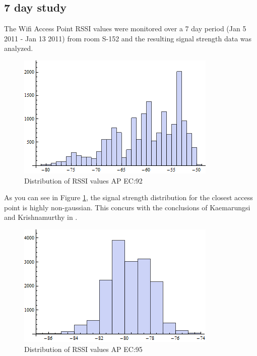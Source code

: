 \subsection{7 day study}

The Wifi Access Point RSSI values were monitored over a 7 day period 
(Jan 5 2011 - Jan 13 2011) from room S-152 and the resulting signal strength 
data was analyzed.


\begin{figure}\centering
    \includegraphics{figures/histogram_00_1C_F0_CB_EC_92.png}
    \caption{Distribution of RSSI values AP EC:92\label{fig:histogram_00_1C_F0_CB_EC_92}}
\end{figure}

As you can see in Figure \ref{fig:histogram_00_1C_F0_CB_EC_92}, the signal 
strength distribution for the closest access point is highly non-gaussian. This
concurs with the conclusions of Kaemarungsi and Krishnamurthy in \cite{KStats}.

\begin{figure}\centering
    \includegraphics{figures/histogram_00_1C_F0_CB_EC_95.png}
    \caption{Distribution of RSSI values AP EC:95\label{fig:histogram_00_1C_F0_CB_EC_95}}
\end{figure}


